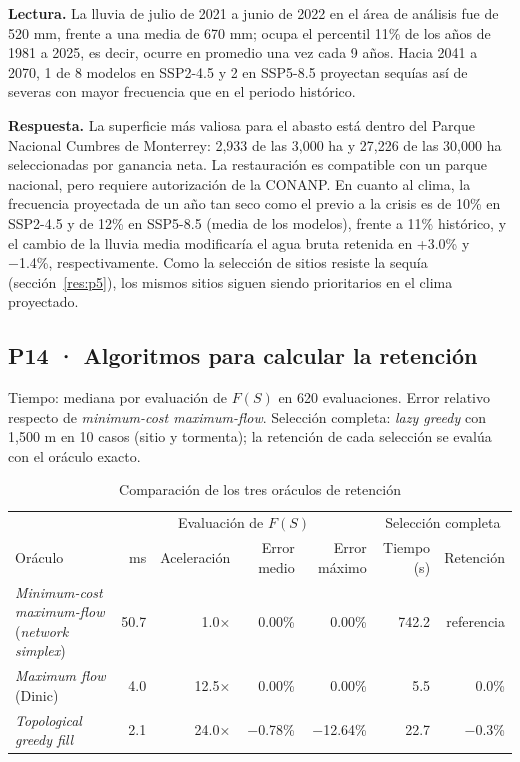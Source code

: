 \documentclass[11pt,letterpaper]{article}
\newcommand{\lectura}[1]{\par\noindent\textcolor{naranja}{\textbf{Lectura.}} #1\par}
\newcommand{\respuesta}[1]{\begin{cajarespuesta}\textbf{\color{naranja}Respuesta.} #1\end{cajarespuesta}}
\begin{document}
\lectura{La lluvia de julio de 2021 a junio de 2022 en el área de análisis fue de 520 mm, frente a una media de 670 mm; ocupa el percentil 11\% de los años de 1981 a 2025, es decir, ocurre en promedio una vez cada 9 años. Hacia 2041 a 2070, 1 de 8 modelos en SSP2-4.5 y 2 en SSP5-8.5 proyectan sequías así de severas con mayor frecuencia que en el periodo histórico.}

\respuesta{La superficie más valiosa para el abasto está dentro del Parque Nacional Cumbres de Monterrey: 2,933 de las 3,000 ha y 27,226 de las 30,000 ha seleccionadas por ganancia neta. La restauración es compatible con un parque nacional, pero requiere autorización de la CONANP. En cuanto al clima, la frecuencia proyectada de un año tan seco como el previo a la crisis es de 10\% en SSP2-4.5 y de 12\% en SSP5-8.5 (media de los modelos), frente a 11\% histórico, y el cambio de la lluvia media modificaría el agua bruta retenida en +3.0\% y −1.4\%, respectivamente. Como la selección de sitios resiste la sequía (sección~\ref{res:p5}), los mismos sitios siguen siendo prioritarios en el clima proyectado.}

\subsection{P14 · Algoritmos para calcular la retención}\label{res:p14}

\begin{table}[H]\centering\small
\caption{Comparación de los tres oráculos de retención}\label{tab:oraculos}
{\color{gris}Tiempo: mediana por evaluación de $F(S)$ en 620 evaluaciones. Error relativo respecto de \emph{minimum-cost maximum-flow}. Selección completa: \emph{lazy greedy} con 1,500 m en 10 casos (sitio y tormenta); la retención de cada selección se evalúa con el oráculo exacto.\par}\smallskip
\begin{tabularx}{\linewidth}{Xrrrrrr}
\toprule
 & \multicolumn{4}{c}{Evaluación de $F(S)$} & \multicolumn{2}{c}{Selección completa} \\
Oráculo & ms & Aceleración & Error medio & Error máximo & Tiempo (s) & Retención \\
\midrule
\emph{Minimum-cost maximum-flow} (\emph{network simplex}) & 50.7 & 1.0× & 0.00\% & 0.00\% & 742.2 & referencia \\
\emph{Maximum flow} (Dinic) & 4.0 & 12.5× & 0.00\% & 0.00\% & 5.5 & 0.0\% \\
\emph{Topological greedy fill} & 2.1 & 24.0× & −0.78\% & −12.64\% & 22.7 & −0.3\% \\
\bottomrule
\end{tabularx}
\end{table}
\end{document}
